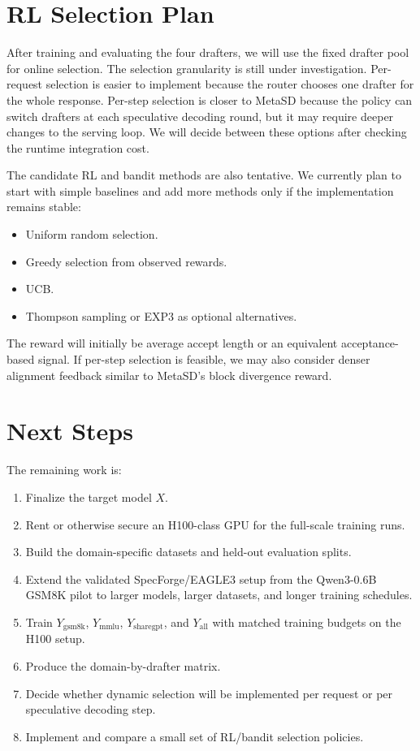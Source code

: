 \documentclass[11pt]{article}
\begin{document}
\section{RL Selection Plan}

After training and evaluating the four drafters, we will use the fixed drafter pool for online selection. The selection granularity is still under investigation. Per-request selection is easier to implement because the router chooses one drafter for the whole response. Per-step selection is closer to MetaSD because the policy can switch drafters at each speculative decoding round, but it may require deeper changes to the serving loop. We will decide between these options after checking the runtime integration cost.

The candidate RL and bandit methods are also tentative. We currently plan to start with simple baselines and add more methods only if the implementation remains stable:
\begin{itemize}
    \item Uniform random selection.
    \item Greedy selection from observed rewards.
    \item UCB.
    \item Thompson sampling or EXP3 as optional alternatives.
\end{itemize}
The reward will initially be average accept length or an equivalent acceptance-based signal. If per-step selection is feasible, we may also consider denser alignment feedback similar to MetaSD's block divergence reward.

\section{Next Steps}

The remaining work is:
\begin{enumerate}
    \item Finalize the target model $X$.
    \item Rent or otherwise secure an H100-class GPU for the full-scale training runs.
    \item Build the domain-specific datasets and held-out evaluation splits.
    \item Extend the validated SpecForge/EAGLE3 setup from the Qwen3-0.6B GSM8K pilot to larger models, larger datasets, and longer training schedules.
    \item Train $Y_{\mathrm{gsm8k}}$, $Y_{\mathrm{mmlu}}$, $Y_{\mathrm{sharegpt}}$, and $Y_{\mathrm{all}}$ with matched training budgets on the H100 setup.
    \item Produce the domain-by-drafter matrix.
    \item Decide whether dynamic selection will be implemented per request or per speculative decoding step.
    \item Implement and compare a small set of RL/bandit selection policies.
\end{enumerate}
\end{document}
